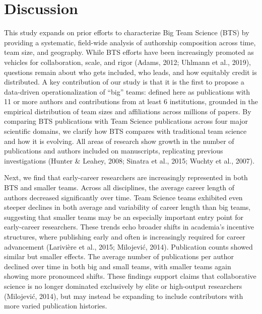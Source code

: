 \documentclass[
  man,floatsintext]{apa7}
\begin{document}
\section{Discussion}\label{discussion}

This study expands on prior efforts to characterize Big Team Science
(BTS) by providing a systematic, field-wide analysis of authorship
composition across time, team size, and geography. While BTS efforts
have been increasingly promoted as vehicles for collaboration, scale,
and rigor (Adams, 2012; Uhlmann et al., 2019), questions remain about who gets
included, who leads, and how equitably credit is distributed. A key
contribution of our study is that it is the first to propose a
data-driven operationalization of ``big'' teams: defined here as
publications with 11 or more authors and contributions from at least 6
institutions, grounded in the empirical distribution of team sizes and
affiliations across millions of papers. By comparing BTS publications
with Team Science publications across four major scientific domains, we
clarify how BTS compares with traditional team science and how it is
evolving. All areas of research show growth in the number of
publications and authors included on manuscripts, replicating previous
investigations (Hunter \& Leahey, 2008; Sinatra et al., 2015; Wuchty et al., 2007).

Next, we find that early-career researchers are increasingly represented
in both BTS and smaller teams. Across all disciplines, the average
career length of authors decreased significantly over time. Team Science
teams exhibited even steeper declines in both average and variability of
career length than big teams, suggesting that smaller teams may be an
especially important entry point for early-career researchers. These
trends echo broader shifts in academia's incentive structures, where
publishing early and often is increasingly required for career
advancement (Larivière et al., 2015; Milojević, 2014). Publication counts showed
similar but smaller effects. The average number of publications per
author declined over time in both big and small teams, with smaller
teams again showing more pronounced shifts. These findings support
claims that collaborative science is no longer dominated exclusively by
elite or high-output researchers (Milojević, 2014), but may instead be
expanding to include contributors with more varied publication
histories.
\end{document}
